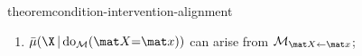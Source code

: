 \begin{linked}{theorem}{condition-intervention-alignment}
\begin{enumerate}[label={(\alph*)}, topsep=0pt,itemsep=0pt]
\item
    $\bar\mu(\X \,|\, \mathrm{do}_{\cal M}(\mat X{=}\mat x))$ can arise from $\mathcal M_{\mat X {\gets} \mat x}$;
% 
    

\end{enumerate}
\end{linked}
